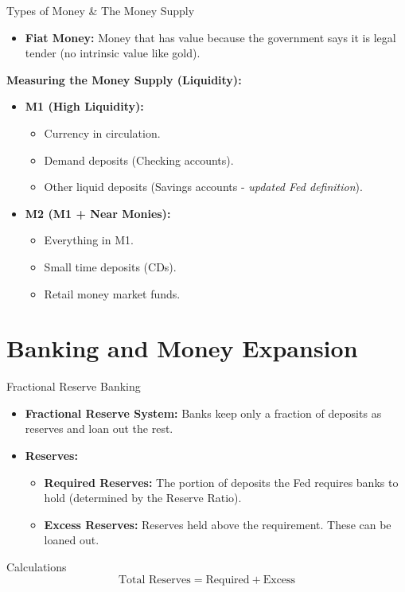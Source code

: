 \documentclass[aspectratio=169]{beamer}
\begin{document}
\begin{frame}{Types of Money \& The Money Supply}
    \begin{itemize}
        \item \textbf{Fiat Money:} Money that has value because the government says it is legal tender (no intrinsic value like gold).
    \end{itemize}

    \vspace{0.3cm}
    \textbf{Measuring the Money Supply (Liquidity):}
    \begin{itemize}
        \item \textbf{M1 (High Liquidity):}
        \begin{itemize}
            \item Currency in circulation.
            \item Demand deposits (Checking accounts).
            \item Other liquid deposits (Savings accounts - \textit{updated Fed definition}).
        \end{itemize}
        \item \textbf{M2 (M1 + Near Monies):}
        \begin{itemize}
            \item Everything in M1.
            \item Small time deposits (CDs).
            \item Retail money market funds.
        \end{itemize}
    \end{itemize}
\end{frame}

\section{Banking and Money Expansion}

\begin{frame}{Fractional Reserve Banking}
    \begin{itemize}
        \item \textbf{Fractional Reserve System:} Banks keep only a fraction of deposits as reserves and loan out the rest.
        \item \textbf{Reserves:}
        \begin{itemize}
            \item \textbf{Required Reserves:} The portion of deposits the Fed requires banks to hold (determined by the Reserve Ratio).
            \item \textbf{Excess Reserves:} Reserves held above the requirement. These can be loaned out.
        \end{itemize}
    \end{itemize}
    
    \begin{block}{Calculations}
        \[ \text{Total Reserves} = \text{Required} + \text{Excess} \]
    \end{block}
\end{frame}
\end{document}
